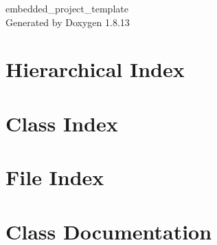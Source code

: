 \documentclass[twoside]{book}
\newcommand{\+}{\discretionary{\mbox{\scriptsize$\hookleftarrow$}}{}{}}
\newcommand{\clearemptydoublepage}{%
  \newpage{\pagestyle{empty}\cleardoublepage}%
}
\begin{document}
\hypersetup{pageanchor=false,
             bookmarksnumbered=true,
             pdfencoding=unicode
            }
\begin{titlepage}
\vspace*{7cm}
\begin{center}%
{\Large embedded\+\_\+project\+\_\+template }\\
\vspace*{1cm}
{\large Generated by Doxygen 1.8.13}\\
\end{center}
\end{titlepage}
\clearemptydoublepage
{}
\tableofcontents
\clearemptydoublepage
{}
\hypersetup{pageanchor=true}

\chapter{Hierarchical Index}

\chapter{Class Index}

\chapter{File Index}

\chapter{Class Documentation}


































\end{document}
